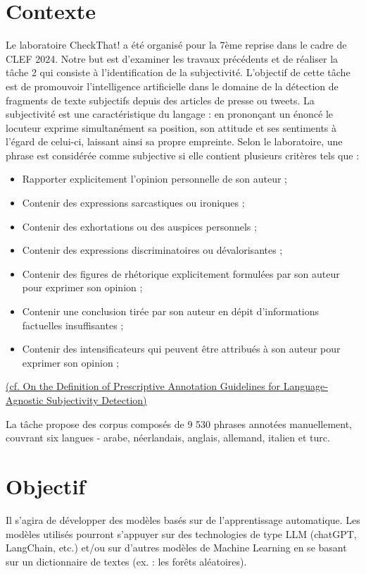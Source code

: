 \documentclass[11pt]{rapport_class}
\begin{document}
\section{Contexte}
\qquad Le laboratoire CheckThat! a été organisé pour la 7ème reprise dans le cadre de CLEF 2024. Notre but est d'examiner les travaux précédents et de réaliser la tâche 2 qui consiste à l’identification de la subjectivité. L'objectif de cette tâche est de promouvoir l’intelligence artificielle dans le domaine de la détection de fragments de texte subjectifs depuis des articles de presse ou tweets. La subjectivité est une caractéristique du langage : en prononçant un énoncé le locuteur exprime simultanément sa position, son attitude et ses sentiments à l'égard de celui-ci, laissant ainsi sa propre empreinte. Selon le laboratoire, une phrase est considérée comme subjective si elle contient plusieurs critères tels que :
\begin{itemize}
    \item Rapporter explicitement l'opinion personnelle de son auteur ;
    \item Contenir des expressions sarcastiques ou ironiques ;
    \item Contenir des exhortations ou des auspices personnels ;
    \item Contenir des expressions discriminatoires ou dévalorisantes ;
    \item Contenir des figures de rhétorique explicitement formulées par son auteur pour exprimer son opinion ;
    \item Contenir une conclusion tirée par son auteur en dépit d'informations factuelles insuffisantes ;
    \item Contenir des intensificateurs qui peuvent être attribués à son auteur pour exprimer son opinion ;
\end{itemize}
\begin{tiny}
\href{https://ceur-ws.org/Vol-3370/paper10.pdf}{(cf. On the Definition of Prescriptive Annotation Guidelines for Language-Agnostic Subjectivity Detection)}
\end{tiny}

La tâche propose des corpus composés de 9 530 phrases annotées manuellement, couvrant six langues - arabe, néerlandais, anglais, allemand, italien et turc.

\section{Objectif}
\qquad Il s'agira de développer des modèles basés sur de l'apprentissage automatique. Les modèles utilisés pourront s’appuyer sur des technologies de type  LLM (chatGPT, LangChain, etc.) et/ou sur d'autres modèles de Machine Learning en se basant sur un dictionnaire de textes (ex. : les forêts aléatoires).
\end{document}
